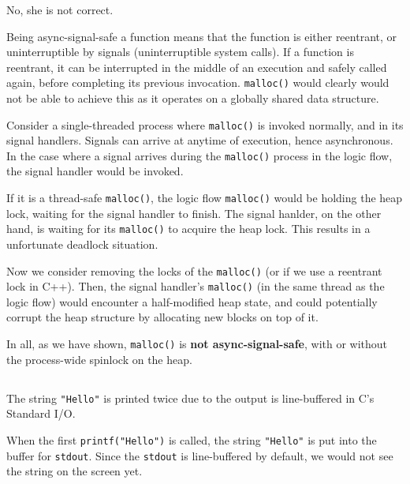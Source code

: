 \documentclass[12pt]{article}
\begin{document}
\subsubsection{}

No, she is not correct.

Being async-signal-safe a function means that the function is either reentrant, or uninterruptible by signals (uninterruptible system calls). If a function is reentrant, it can be interrupted in the middle of an execution and safely called again, before completing its previous invocation. \texttt{malloc()} would clearly would not be able to achieve this as it operates on a globally shared data structure.

Consider a single-threaded process where \texttt{malloc()} is invoked normally, and in its signal handlers. Signals can arrive at anytime of execution, hence asynchronous. In the case where a signal arrives during the \texttt{malloc()} process in the logic flow, the signal handler would be invoked. 

If it is a thread-safe \texttt{malloc()}, the logic flow \texttt{malloc()} would be holding the heap lock, waiting for the signal handler to finish. The signal hanlder, on the other hand, is waiting for its \texttt{malloc()} to acquire the heap lock. This results in a unfortunate deadlock situation.

Now we consider removing the locks of the \texttt{malloc()} (or if we use a reentrant lock in C++). Then, the signal handler's \texttt{malloc()} (in the same thread as the logic flow) would encounter a half-modified heap state, and could potentially corrupt the heap structure by allocating new blocks on top of it.

In all, as we have shown, \texttt{malloc()} is \textbf{not async-signal-safe}, with or without the process-wide spinlock on the heap.

\subsection{}

\subsubsection{}

The string \texttt{"Hello"} is printed twice due to the output is line-buffered in C's Standard I/O.

When the first \texttt{printf("Hello")} is called, the string \texttt{"Hello"} is put into the buffer for \texttt{stdout}. Since the \texttt{stdout} is line-buffered by default, we would not see the string on the screen yet.
\end{document}

